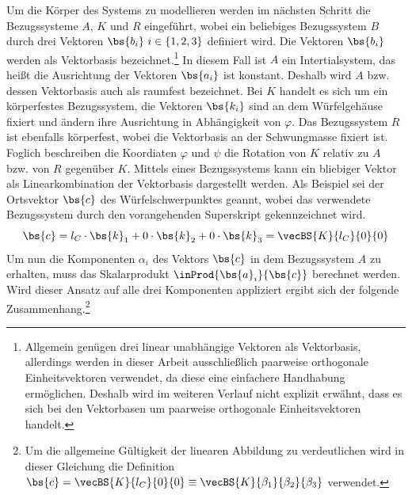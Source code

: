 Um die Körper des Systems zu modellieren werden im nächsten Schritt die Bezugssysteme $A$, $K$ und $R$ eingeführt, wobei ein beliebiges Bezugssystem $B$ durch drei Vektoren $\bs{b_i} \ i \in \{1,2,3\}$ definiert wird. Die Vektoren $\bs{b_i}$ werden als Vektorbasis bezeichnet.\footnote{Allgemein genügen drei linear unabhängige Vektoren als Vektorbasis, allerdings werden in dieser Arbeit ausschließlich paarweise orthogonale Einheitsvektoren verwendet, da diese eine einfachere Handhabung ermöglichen. Deshalb wird im weiteren Verlauf nicht explizit erwähnt, dass es sich bei den Vektorbasen um paarweise orthogonale Einheitsvektoren handelt.} In diesem Fall ist $A$ ein Intertialsystem, das heißt die Ausrichtung der Vektoren $\bs{a_i}$ ist konstant. Deshalb wird $A$ bzw. dessen Vektorbasis auch als raumfest bezeichnet. Bei $K$ handelt es sich um ein körperfestes Bezugssystem, die Vektoren $\bs{k_i}$ sind an dem Würfelgehäuse fixiert und ändern ihre Ausrichtung in Abhängigkeit von $\varphi$. Das Bezugssystem $R$ ist ebenfalls körperfest, wobei die Vektorbasis an der Schwungmasse fixiert ist. Foglich beschreiben die Koordiaten $\varphi$ und $\psi$ die Rotation von $K$ relativ zu $A$ bzw. von $R$ gegenüber $K$. Mittels eines Bezugssystems kann ein bliebiger Vektor als Linearkombination der Vektorbasis dargestellt werden. Als Beispiel sei der Ortsvektor $\bs{c}$ des Würfelschwerpunktes geannt, wobei das verwendete Bezugssystem durch den vorangehenden Superskript gekennzeichnet wird.
\begin{equation}
\bs{c} = l_C \cdot \bs{k}_1 + 0 \cdot \bs{k}_2 + 0 \cdot \bs{k}_3 = \vecBS{K}{l_C}{0}{0}
\end{equation}
Um nun die Komponenten $\alpha_i$ des Vektors $\bs{c}$ in dem Bezugssystem $A$ zu erhalten, muss das Skalarprodukt $\inProd{\bs{a}_i}{\bs{c}}$ berechnet werden. Wird dieser Ansatz auf alle drei Komponenten appliziert ergibt sich der folgende Zusammenhang.\footnote{Um die allgemeine Gültigkeit der linearen Abbildung zu verdeutlichen wird in dieser Gleichung die Definition $\bs{c}=\vecBS{K}{l_C}{0}{0}\equiv\vecBS{K}{\beta_1}{\beta_2}{\beta_3}$ verwendet.}
